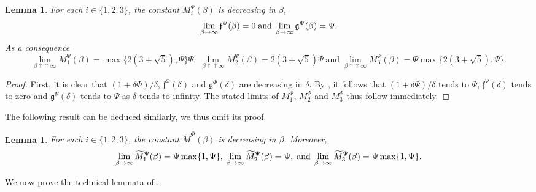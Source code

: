 \documentclass[10pt]{article} %
\newtheorem{lemma}[theorem]{Lemma}
\newcommand\ff{\mathfrak f}
\newcommand\fg{\mathfrak g}
\begin{document}
\begin{lemma}\label{lem::contraction_constants_reflected_bsde}
	For each $i \in \{1,2,3\}$, the constant $M^\Psi_i(\beta)$ is decreasing in $\beta$,
	\begin{equation*}
		\lim_{\beta \rightarrow\infty} \ff^\Psi(\beta) = 0 \; \text{\rm and} \; \lim_{\beta \rightarrow\infty} \fg^\Psi(\beta) = \Psi.
	\end{equation*}
	As a consequence
	\begin{equation*}
		\lim_{\beta\uparrow\uparrow\infty} M^\Psi_1(\beta) =\max\{2(3+\sqrt{5}),\Psi\}\Psi, \; \lim_{\beta\uparrow\uparrow\infty} M^\Psi_2(\beta) = 2(3+\sqrt{5})\Psi \; \text{and} \; \lim_{\beta\uparrow\uparrow\infty} M^\Psi_3(\beta) = \Psi\max\{2(3+\sqrt{5}),\Psi\}.
	\end{equation*}
\end{lemma}


\begin{proof}
	First, it is clear that $(1+\delta\Phi)/\delta$, $\ff^\Phi(\delta)$ and $\fg^\Phi(\delta)$ are decreasing in $\delta$. By , it follows that $(1+\delta\Psi)/\delta$ tends to $\Psi$, $\ff^\Psi(\delta)$ tends to zero and $\fg^\Psi(\delta)$ tends to $\Psi$ as $\delta$ tends to infinity. The stated limits of $M^\Psi_1$, $M^\Psi_2$ and $M^\Psi_3$ thus follow immediately.
\end{proof}

The following result can be deduced similarly, we thus omit its proof.

\begin{lemma}\label{lem::contraction_constants_bsde}
	For each $i \in \{1,2,3\}$, the constant $\widetilde M^\Phi(\beta)$ is decreasing in $\beta$. Moreover,
	\begin{equation*}
		\lim_{\beta\rightarrow\infty} \widetilde M^\Psi_1(\beta) =
			\Psi\max\{1,\Psi\},
		\; 
		\lim_{\beta\rightarrow\infty} \widetilde M^\Psi_2(\beta) = \Psi, \; \text{\rm and} \; 
		 \lim_{\beta\rightarrow\infty} \widetilde M^\Psi_3(\beta) = \Psi\max\{1,\Psi\}.
	\end{equation*}
\end{lemma}


We now prove the technical lemmata of .
\end{document}
